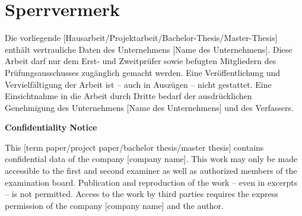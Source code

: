 \chapter*{Sperrvermerk}
\label{sec:sperrvermerk}

Die vorliegende [Hausarbeit/Projektarbeit/Bachelor-Thesis/Master-Thesis] enthält vertrauliche Daten des Unternehmens [Name des Unternehmens]. Diese Arbeit darf nur dem Erst- und Zweitprüfer sowie befugten Mitgliedern des Prüfungsausschusses zugänglich gemacht werden. Eine Veröffentlichung und Vervielfältigung der Arbeit ist – auch in Auszügen – nicht gestattet. Eine Einsichtnahme in die Arbeit durch Dritte bedarf der ausdrücklichen Genehmigung des Unternehmens [Name des Unternehmens] und des Verfassers.

\vspace{1cm}

\begin{center}
\textbf{Confidentiality Notice}
\end{center}

This [term paper/project paper/bachelor thesis/master thesis] contains confidential data of the company [company name]. This work may only be made accessible to the first and second examiner as well as authorized members of the examination board. Publication and reproduction of the work – even in excerpts – is not permitted. Access to the work by third parties requires the express permission of the company [company name] and the author.